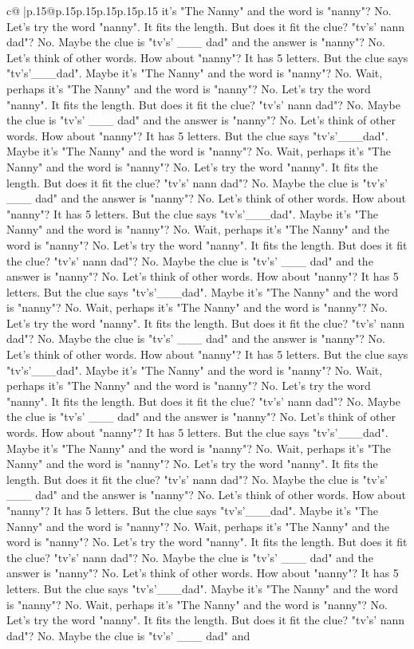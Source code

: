\documentclass{article}
\begin{document}
{\begin{supertabular}{c@{$\;$}|p{.15\linewidth}@{}p{.15\linewidth}p{.15\linewidth}p{.15\linewidth}p{.15\linewidth}p{.15\linewidth}}
{{{it's "The Nanny" and the word is "nanny"? No. Let's try the word "nanny". It fits the length. But does it fit the clue? "tv's' nann dad"? No. Maybe the clue is "tv's' \_\_\_ dad" and the answer is "nanny"? No. Let's think of other words. How about "nanny"? It has 5 letters. But the clue says "tv's'\_\_\_dad". Maybe it's "The Nanny" and the word is "nanny"? No. Wait, perhaps it's "The Nanny" and the word is "nanny"? No. Let's try the word "nanny". It fits the length. But does it fit the clue? "tv's' nann dad"? No. Maybe the clue is "tv's' \_\_\_ dad" and the answer is "nanny"? No. Let's think of other words. How about "nanny"? It has 5 letters. But the clue says "tv's'\_\_\_dad". Maybe it's "The Nanny" and the word is "nanny"? No. Wait, perhaps it's "The Nanny" and the word is "nanny"? No. Let's try the word "nanny". It fits the length. But does it fit the clue? "tv's' nann dad"? No. Maybe the clue is "tv's' \_\_\_ dad" and the answer is "nanny"? No. Let's think of other words. How about "nanny"? It has 5 letters. But the clue says "tv's'\_\_\_dad". Maybe it's "The Nanny" and the word is "nanny"? No. Wait, perhaps it's "The Nanny" and the word is "nanny"? No. Let's try the word "nanny". It fits the length. But does it fit the clue? "tv's' nann dad"? No. Maybe the clue is "tv's' \_\_\_ dad" and the answer is "nanny"? No. Let's think of other words. How about "nanny"? It has 5 letters. But the clue says "tv's'\_\_\_dad". Maybe it's "The Nanny" and the word is "nanny"? No. Wait, perhaps it's "The Nanny" and the word is "nanny"? No. Let's try the word "nanny". It fits the length. But does it fit the clue? "tv's' nann dad"? No. Maybe the clue is "tv's' \_\_\_ dad" and the answer is "nanny"? No. Let's think of other words. How about "nanny"? It has 5 letters. But the clue says "tv's'\_\_\_dad". Maybe it's "The Nanny" and the word is "nanny"? No. Wait, perhaps it's "The Nanny" and the word is "nanny"? No. Let's try the word "nanny". It fits the length. But does it fit the clue? "tv's' nann dad"? No. Maybe the clue is "tv's' \_\_\_ dad" and the answer is "nanny"? No. Let's think of other words. How about "nanny"? It has 5 letters. But the clue says "tv's'\_\_\_dad". Maybe it's "The Nanny" and the word is "nanny"? No. Wait, perhaps it's "The Nanny" and the word is "nanny"? No. Let's try the word "nanny". It fits the length. But does it fit the clue? "tv's' nann dad"? No. Maybe the clue is "tv's' \_\_\_ dad" and the answer is "nanny"? No. Let's think of other words. How about "nanny"? It has 5 letters. But the clue says "tv's'\_\_\_dad". Maybe it's "The Nanny" and the word is "nanny"? No. Wait, perhaps it's "The Nanny" and the word is "nanny"? No. Let's try the word "nanny". It fits the length. But does it fit the clue? "tv's' nann dad"? No. Maybe the clue is "tv's' \_\_\_ dad" and the answer is "nanny"? No. Let's think of other words. How about "nanny"? It has 5 letters. But the clue says "tv's'\_\_\_dad". Maybe it's "The Nanny" and the word is "nanny"? No. Wait, perhaps it's "The Nanny" and the word is "nanny"? No. Let's try the word "nanny". It fits the length. But does it fit the clue? "tv's' nann dad"? No. Maybe the clue is "tv's' \_\_\_ dad" and }}}
\end{supertabular}}
\end{document}
